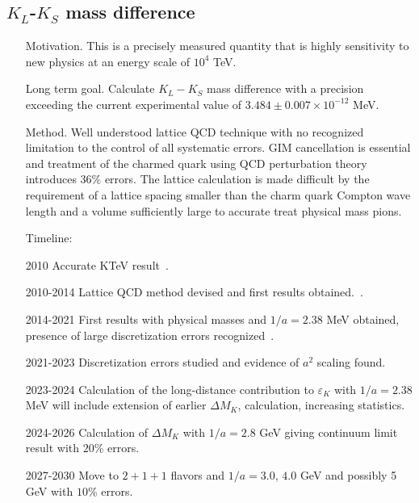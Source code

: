 \documentclass[prd,showpacs,showkeys,preprintnumbers,floatfix,
nofootinbib%
]{revtex4-2}
\begin{document}
\subsection{$K_L$-$K_S$ mass difference}
\begin{itemize}
    \item[Motivation.] This is a precisely measured quantity that is highly sensitivity to new physics 
    at an energy scale of $10^4$ TeV.
    \item[Long term goal.] Calculate $K_L - K_S$ mass difference with
    a precision exceeding the current experimental value of $3.484
    \pm 0.007 \times  10^{-12}$ MeV.
    \item[Method.] Well understood lattice QCD technique with no
    recognized limitation to the control of all systematic
    errors. GIM cancellation is essential and treatment of the
    charmed quark using QCD perturbation theory introduces 36\%
    errors. The lattice calculation is made diﬀicult by the
    requirement of a lattice spacing smaller than the charm quark
    Compton wave length and a volume suﬀiciently large to accurate
    treat physical mass pions. 
\item[Timeline:]
    \item[2010] Accurate KTeV result~\cite{KTeV:2010sng}.
    \item[2010-2014] Lattice QCD method devised and first results 
    obtained.~\cite{Christ:2012se, Bai:2014cva}.
    \item[2014-2021] First results with physical masses and $1/a = 2.38$ MeV 
    obtained, presence of large discretization errors recognized~\cite{Bai:2018lrm, 
    Wang:2021twm}.
    \item[2021-2023] Discretization errors studied and evidence of $a^2$ scaling 
    found.
    \item[2023-2024] Calculation of the long-distance contribution to
    $\varepsilon_K$ with $1/a = 2.38$ MeV will include extension of
    earlier $\Delta M_K$, calculation, increasing statistics.
    \item[2024-2026] Calculation of $\Delta M_K$ with $1/a = 2.8$ GeV
    giving continuum limit result with $20$\% errors. 
    \item[2027-2030] Move to $2+1+1$ flavors and $1/a = 3.0$, $4.0$
    GeV and possibly 5 GeV with $10$\% errors. 
\end{itemize}

\end{document}
